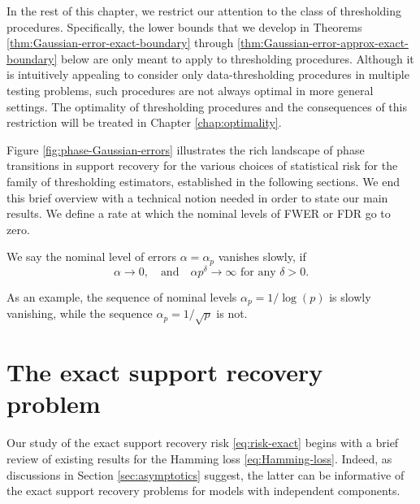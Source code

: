 In the rest of this chapter, we restrict our attention to the class of thresholding procedures. Specifically, the lower bounds that we develop in 
Theorems \ref{thm:Gaussian-error-exact-boundary} through \ref{thm:Gaussian-error-approx-exact-boundary} below are only meant to apply to thresholding
 procedures.  Although it is intuitively appealing to consider only data-thresholding procedures in multiple testing problems, such procedures are not always optimal in more general settings. 
The optimality of thresholding procedures and the consequences of this restriction will be treated in Chapter \ref{chap:optimality}.


Figure \ref{fig:phase-Gaussian-errors} illustrates the rich landscape of phase transitions in support recovery for the various choices
of statistical risk for the family of thresholding estimators, established in the following sections.
We end this brief overview with a technical notion needed in order to state our main results.
We define a rate at which the nominal levels of FWER or FDR go to zero.
\begin{definition} \label{def:slowly-vanishing}
We say the nominal level of errors $\alpha = \alpha_p$ vanishes slowly, if
\begin{equation} \label{eq:slowly-vanishing-error}
    \alpha\to 0,\quad \text{and} \quad \alpha p^\delta\to\infty \text{  for any } \delta>0.
\end{equation}
\end{definition}
As an example, the sequence of nominal levels $\alpha_p = 1/\log{(p)}$ is slowly vanishing, while the sequence $\alpha_p = 1/\sqrt{p}$ is not.





\section{The exact support recovery problem}
\label{subsec:exact-support-recovery-Gaussian}

Our study of the exact support recovery risk \eqref{eq:risk-exact} begins with a brief review of existing results for the Hamming loss \eqref{eq:Hamming-loss}.
Indeed, as discussions in Section \ref{sec:asymptotics} suggest, the latter can be informative of the exact support recovery problems for models with independent components.

